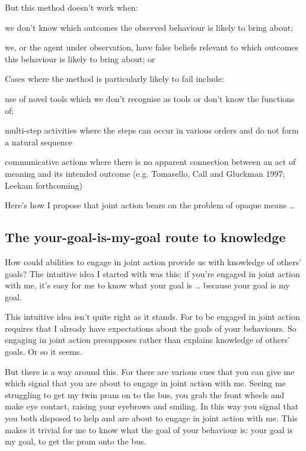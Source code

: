 \documentclass[14pt,a4paper]{extarticle}
\begin{document}
But this method doesn’t work when: 
%
\begin{list}{*}{}
\item we don’t know which outcomes the observed behaviour is likely to bring about;
\item we, or the agent under observation, have false beliefs relevant to which outcomes this behaviour is likely to bring about; or
\end{list}
%
Cases where the method is particularly likely to fail include:
%
\begin{list}{*}{}
\item use of novel tools which we don’t recognise as tools or don’t know the functions of;
\item multi-step activities where the steps can occur in various orders and do not form a natural sequence 
\item communicative actions where there is no apparent connection between an act of meaning and its intended outcome (e.g. Tomasello, Call and Gluckman 1997; Leekam forthcoming)
\end{list}
%
Here’s how I propose that joint action bears on the problem of opaque means …


\subsection{The your-goal-is-my-goal route to knowledge}

How could abilities to engage in joint action provide us with knowledge of others’ goals?   The intuitive idea I started with was this: if you’re engaged in joint action with me, it’s easy for me to know what your goal is … because your goal is my goal.  

This intuitive idea isn’t quite right as it stands.  For to be engaged in joint action requires that I already have expectations about the goals of your behaviours.  
So engaging in joint action presupposes rather than explains knowledge of others’ goals.  Or so it seems.

But there is a way around this.  For there are various cues that you can give me which signal that you are about to engage in joint action with me.  Seeing me struggling to get my twin pram on to the bus, you grab the front wheels and make eye contact, raising your eyebrows and smiling.  In this way you signal that you both disposed to help and are about to engage in joint action with me.  This makes it trivial for me to know what the goal of your behaviour is: your goal is my goal, to get the pram onto the bus.
\end{document}
